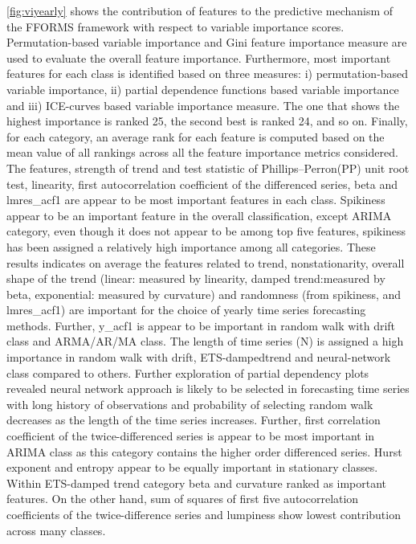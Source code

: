 \documentclass[11pt,a4paper,]{article}
\begin{document}
\autoref{fig:viyearly} shows the contribution of features to the
predictive mechanism of the FFORMS framework with respect to variable
importance scores. Permutation-based variable importance and Gini
feature importance measure are used to evaluate the overall feature
importance. Furthermore, most important features for each class is
identified based on three measures: i) permutation-based variable
importance, ii) partial dependence functions based variable importance
and iii) ICE-curves based variable importance measure. The one that
shows the highest importance is ranked 25, the second best is ranked 24,
and so on. Finally, for each category, an average rank for each feature
is computed based on the mean value of all rankings across all the
feature importance metrics considered. The features, strength of trend
and test statistic of Phillips--Perron(PP) unit root test, linearity,
first autocorrelation coefficient of the differenced series, beta and
lmres\_acf1 are appear to be most important features in each class.
Spikiness appear to be an important feature in the overall
classification, except ARIMA category, even though it does not appear to
be among top five features, spikiness has been assigned a relatively
high importance among all categories. These results indicates on average
the features related to trend, nonstationarity, overall shape of the
trend (linear: measured by linearity, damped trend:measured by beta,
exponential: measured by curvature) and randomness (from spikiness, and
lmres\_acf1) are important for the choice of yearly time series
forecasting methods. Further, y\_acf1 is appear to be important in
random walk with drift class and ARMA/AR/MA class. The length of time
series (N) is assigned a high importance in random walk with drift,
ETS-dampedtrend and neural-network class compared to others. Further
exploration of partial dependency plots revealed neural network approach
is likely to be selected in forecasting time series with long history of
observations and probability of selecting random walk decreases as the
length of the time series increases. Further, first correlation
coefficient of the twice-differenced series is appear to be most
important in ARIMA class as this category contains the higher order
differenced series. Hurst exponent and entropy appear to be equally
important in stationary classes. Within ETS-damped trend category beta
and curvature ranked as important features. On the other hand, sum of
squares of first five autocorrelation coefficients of the
twice-difference series and lumpiness show lowest contribution across
many classes.
\end{document}
